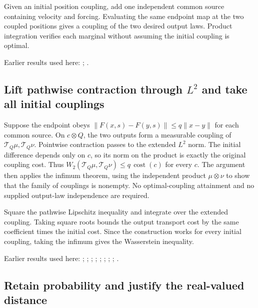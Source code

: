 \documentclass[11pt,a4paper]{report}
\begin{document}
Given an initial position coupling, add one independent common source containing velocity and forcing. Evaluating the same endpoint map at the two coupled positions gives a coupling of the two desired output laws. Product integration verifies each marginal without assuming the initial coupling is optimal.



Earlier results used here: \cite[Section~3.17.1]{LangevinLean2026ULASC}; \cite[Section~3.22.2]{LangevinLean2026ULASC}.
\subsection{\texorpdfstring{Lift pathwise contraction through \(L^{2}\) and take all initial couplings}{Lift pathwise contraction through L² and take all initial couplings}}
\label{report-step-KineticLangevin-FlowLaw-lean-2}


Suppose the endpoint obeys \(\|F(x,s)-F(y,s)\|\le q\|x-y\|\) for each common source. On \(c\otimes Q\), the two outputs form a measurable coupling of \(\mathcal T_Q\mu,\mathcal T_Q\nu\). Pointwise contraction passes to the extended \(L^{2}\) norm. The initial difference depends only on \(c\), so its norm on the product is exactly the original coupling cost. Thus \(W_2(\mathcal T_Q\mu,\mathcal T_Q\nu)\le q\,\operatorname{cost}(c)\) for every \(c\). The argument then applies the infimum theorem, using the independent product \(\mu\otimes\nu\) to show that the family of couplings is nonempty. No optimal-coupling attainment and no supplied output-law independence are required.



Square the pathwise Lipschitz inequality and integrate over the extended coupling. Taking square roots bounds the output transport cost by the same coefficient times the initial cost. Since the construction works for every initial coupling, taking the infimum gives the Wasserstein inequality.



Earlier results used here: \cite[Section~3.17.1]{LangevinLean2026ULASC}; \cite[Section~3.17.14]{LangevinLean2026ULASC}; \cite[Section~3.17.2]{LangevinLean2026ULASC}; \cite[Section~3.17.3]{LangevinLean2026ULASC}; \cite[Section~3.17.9]{LangevinLean2026ULASC}; \cite[Section~3.18.1]{LangevinLean2026ULASC}; \cite[Section~3.22.10]{LangevinLean2026ULASC}; \cite[Section~3.22.15]{LangevinLean2026ULASC}; \cite[Section~3.22.2]{LangevinLean2026ULASC}.
\subsection{\texorpdfstring{Retain probability and justify the real-valued distance}{Retain probability and justify the real-valued distance}}
\label{report-step-KineticLangevin-FlowLaw-lean-3}
\end{document}
